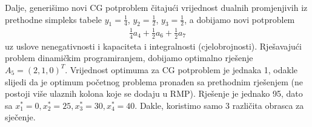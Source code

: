 \documentclass[a4paper, utf8, 11pt, colorlinks]{book}
\theoremstyle{definition}
\begin{document}
Dalje, generišimo novi CG potproblem čitajući vrijednost dualnih promjenjivih iz prethodne simpleks tabele $y_1 = \frac{1}{4}$, $y_2 = \frac{1}{2}$, $y_3= \frac{1}{2}$, a dobijamo novi potproblem
\begin{align*}
	 \frac{1}{4} a_4 + \frac{1}{2} a_6 + \frac{1}{2} a_7
\end{align*}
uz uslove nenegativnosti i kapaciteta i integralnosti (cjelobrojnosti). Rješavajući problem dinamičkim programiranjem, dobijamo optimalno rješenje $A_5 = (2,1,0)^T$. Vrijednost optimuma za CG potproblem je jednaka 1, odakle slijedi da je optimum početnog problema pronađen sa prethodnim rješenjem (ne postoji više ulaznih kolona koje se dodaju u RMP). Rješenje je jednako 95, dato sa $x_1^* = 0, x_2^* = 25, x_3^*=30, x_4^*= 40$. Dakle, koristimo samo 3 različita obrasca za sječenje. 
\\ \vspace{1cm}
\end{document}
